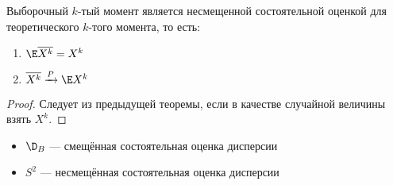 \begin{theorem}
    Выборочный \(k\)-тый момент является несмещенной состоятельной оценкой для теоретического \(k\)-того момента, то есть:
    \begin{enumerate}
        \item \(\E \overline{X^k} = X^k\)
        \item \(\overline{X^k} \xrightarrow[]{P} \E X^k\)
    \end{enumerate}
\end{theorem}
\begin{proof}
    Следует из предыдущей теоремы, если в качестве случайной величины взять \(X^k\).
\end{proof}

\begin{theorem}\itemfix
    \begin{itemize}
        \item \(\D_B\) --- смещённая состоятельная оценка дисперсии
        \item \(S^2\) --- несмещённая состоятельная оценка дисперсии
    \end{itemize}
\end{theorem}
